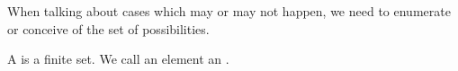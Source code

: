 
\sbasic


\sstart
{}


When talking about cases which
may or may not happen, we need
to enumerate or conceive of the
set of possibilities.


A 
is a finite set.
We call an element an .

\strats

